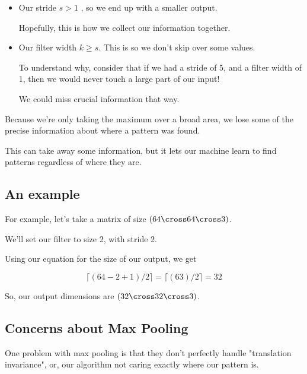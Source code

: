         \begin{itemize}
            \item Our stride $s > 1$ , so we end up with a smaller output.
            
            Hopefully, this is how we collect our information together.
        
            \item Our filter width $k \geq s$. This is so we don't skip over some values.
            
                To understand why, consider that if we had a stride of 5, and a filter width of 1, then we would never touch a large part of our input!
                
                We could miss crucial information that way.
                
        \end{itemize}
        
        Because we're only taking the maximum over a broad area, we lose some of the precise information about where a pattern was found. 
        
        This can take away some information, but it lets our machine learn to find patterns regardless of where they are.
        
    \subsection{An example}
    
        For example, let's take a matrix of size $(64 \cross 64 \cross 3)$.
        
        We'll set our filter to size 2, with stride 2.
        
        Using our equation for the size of our output, we get
        
        \begin{equation*}
            \lceil ( 64 - 2 + 1 )/2 \rceil = \lceil ( 63 )/2 \rceil = 32
        \end{equation*}
        
        So, our output dimensions are $(32 \cross 32 \cross 3)$.
        
    \subsection{Concerns about Max Pooling}
    
        One problem with max pooling is that they don't perfectly handle "translation invariance", or, our algorithm not caring exactly where our pattern is.
        
